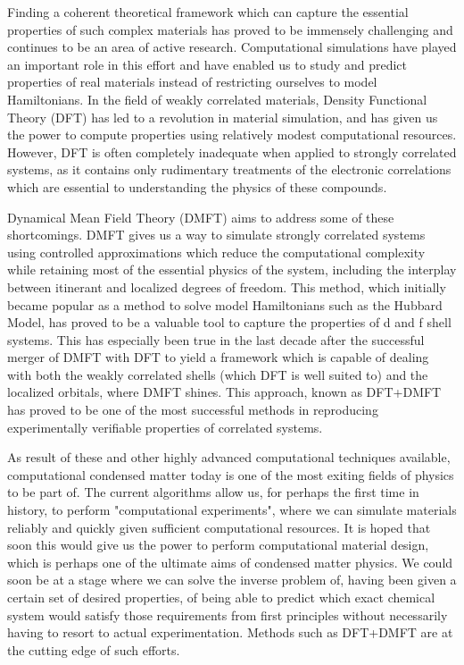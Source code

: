 \documentclass[10pt]{ruthesis}
\begin{document}
Finding a coherent theoretical framework which can capture the essential properties of such complex materials has proved to be immensely challenging and continues to be an area of active research. Computational simulations have played an important role in this effort and have enabled us to study and predict properties of real materials instead of restricting ourselves to model Hamiltonians. In the field of weakly correlated materials, Density Functional Theory (DFT) has led to a revolution in material simulation, and has given us the power to compute properties using relatively modest computational resources. However, DFT is often completely inadequate when applied to strongly correlated systems, as it contains only rudimentary treatments of the electronic correlations which are essential to understanding the physics of these compounds.

Dynamical Mean Field Theory (DMFT) aims to address some of these shortcomings. DMFT gives us a way to simulate strongly correlated systems using controlled approximations which reduce the computational complexity while retaining most of the essential physics of the system, including the interplay between itinerant and localized degrees of freedom. This method, which initially became popular as a method to solve model Hamiltonians such as the Hubbard Model, has proved to be a valuable tool to capture the properties of d and f shell systems. This has especially been true in the last decade after the successful merger of DMFT with DFT to yield a framework which is capable of dealing with both the weakly correlated shells (which DFT is well suited to) and the localized orbitals, where DMFT shines. This approach, known as DFT+DMFT has proved to be one of the most successful methods in reproducing experimentally verifiable properties of correlated systems.

As result of these and other highly advanced computational techniques available, computational condensed matter today is one of the most exiting fields of physics to be part of. The current algorithms allow us, for perhaps the first time in history, to perform "computational experiments", where we can simulate materials reliably and quickly given sufficient computational resources. It is hoped that soon this would give us the power to perform computational material design, which is perhaps one of the ultimate aims of condensed matter physics. We could soon be at a stage where we can solve the inverse problem of, having been given a certain set of desired properties, of being able to predict which exact chemical system would satisfy those requirements from first principles without necessarily having to resort to actual experimentation. Methods such as DFT+DMFT are at the cutting edge of such efforts. 
\end{document}
